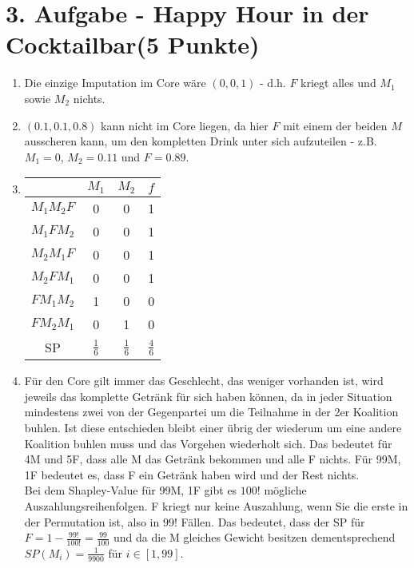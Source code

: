 \documentclass[a4paper, 11pt]{article}
\begin{document}
\section*{3. Aufgabe - Happy Hour in der Cocktailbar\hfill {\small (5 Punkte)}}
\begin{enumerate}
\item
Die einzige Imputation im Core wäre $(0,0,1)$ - d.h. $F$ kriegt alles und $M_1$ sowie $M_2$ nichts.
\item 
$(0.1,0.1,0.8)$ kann nicht im Core liegen, da hier $F$ mit einem der beiden $M$ ausscheren kann, um den kompletten Drink unter sich aufzuteilen - z.B. $M_1 = 0$, $M_2 =0.11$ und $F=0.89$.
\item
\begin{tabular}{c || c c c}
& $M_1$ & $M_2$ & $f$ \\ \hline
$M_1M_2F$ & 0 & 0 & 1 \\
$M_1FM_2 $ & 0 & 0 & 1 \\
$M_2M_1F$ & 0 & 0 & 1 \\
$M_2FM_1$ & 0 & 0 & 1 \\
$FM_1M_2$ & 1 & 0 & 0 \\
$FM_2M_1$ & 0 & 1 & 0 \\
SP & $\frac{1}{6}$ & $\frac{1}{6}$ & $\frac{4}{6}$ \\
\end{tabular}
\item
Für den Core gilt immer das Geschlecht, das weniger vorhanden ist, wird jeweils das komplette Getränk für sich haben können, da in jeder Situation mindestens zwei von der Gegenpartei um die Teilnahme in der 2er Koalition buhlen. Ist diese entschieden bleibt einer übrig der wiederum um eine andere Koalition buhlen muss und das Vorgehen wiederholt sich. Das bedeutet für 4M und 5F, dass alle M das Getränk bekommen und alle F nichts. Für 99M, 1F bedeutet es, dass F ein Getränk haben wird und der Rest nichts.\\

Bei dem Shapley-Value für 99M, 1F gibt es $100!$ mögliche Auszahlungsreihenfolgen. F kriegt nur keine Auszahlung, wenn Sie die erste in der Permutation ist, also in $99!$ Fällen. Das bedeutet, dass der SP für $F = 1 - \frac{99!}{100!} = \frac{99}{100}$ und da die M gleiches Gewicht besitzen dementsprechend $SP(M_i) = \frac{1}{9900}$ für $i \in [1,99]$.\\


\end{enumerate}
\end{document}
